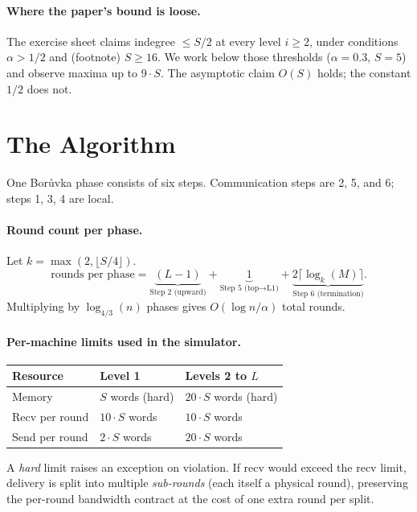 \documentclass[11pt]{article}
\begin{document}
\paragraph{Where the paper's bound is loose.} The exercise sheet
\cite{exercise12} claims indegree $\le S/2$ at every level $i \ge 2$,
under conditions $\alpha > 1/2$ and (footnote) $S \ge 16$. We work below
those thresholds ($\alpha = 0.3$, $S = 5$) and observe maxima up to
$9 \cdot S$. The asymptotic claim $O(S)$ holds; the constant $1/2$ does not.

\section{The Algorithm}
\label{sec:algo}

One Bor\r{u}vka phase consists of six steps. Communication steps are 2, 5,
and 6; steps 1, 3, 4 are local.

\paragraph{Round count per phase.} Let $k = \max(2, \lfloor S/4 \rfloor)$.
\[
    \text{rounds per phase} = \underbrace{(L - 1)}_{\text{Step 2 (upward)}}
    + \underbrace{1}_{\text{Step 5 (top}\to\text{L1)}}
    + \underbrace{2 \lceil \log_k(M) \rceil}_{\text{Step 6 (termination)}}.
\]
Multiplying by $\log_{4/3}(n)$ phases gives $O(\log n / \alpha)$ total
rounds.

\paragraph{Per-machine limits used in the simulator.}
\begin{center}
\begin{tabular}{lll}
\toprule
Resource & Level 1 & Levels 2 to $L$ \\
\midrule
Memory & $S$ words (hard) & $20 \cdot S$ words (hard) \\
Recv per round & $10 \cdot S$ words & $10 \cdot S$ words \\
Send per round & $2 \cdot S$ words & $20 \cdot S$ words \\
\bottomrule
\end{tabular}
\end{center}
A \textit{hard} limit raises an exception on violation. If recv would exceed
the recv limit, delivery is split into multiple \textit{sub-rounds} (each
itself a physical round), preserving the per-round bandwidth contract at
the cost of one extra round per split.
\end{document}
